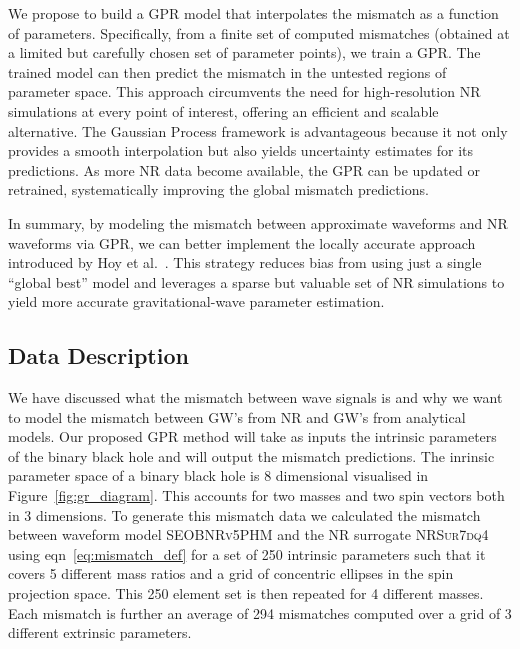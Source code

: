 \documentclass[12pt]{article}
\begin{document}
We propose to build a GPR model that interpolates the mismatch as a function of parameters. Specifically, from a finite set of computed mismatches (obtained at a limited but carefully chosen set of parameter points), we train a GPR. The trained model can then predict the mismatch in the untested regions of parameter space. This approach circumvents the need for high-resolution NR simulations at every point of interest,
offering an efficient and scalable alternative. The Gaussian Process framework is advantageous because it not only provides a smooth interpolation but also yields uncertainty estimates for its predictions.
 As more NR data become available, the GPR can be updated or retrained, systematically improving the global mismatch predictions.

 In summary, by modeling the mismatch between approximate waveforms and NR waveforms via GPR, we can better implement the locally accurate approach introduced by Hoy et al.~\cite{Ogpaper}. This strategy reduces bias from using just a single “global best” model and leverages a sparse but valuable set of NR simulations to yield more accurate gravitational-wave parameter estimation.

\subsection{Data Description}
We have discussed what the mismatch between wave signals is and why we want to model the mismatch between GW's from NR and GW's from analytical models.
Our proposed GPR method will take as inputs the intrinsic parameters of the binary black hole and will output the mismatch predictions.
The inrinsic parameter space of a binary black hole is 8 dimensional visualised in Figure~\ref{fig:gr_diagram}. This accounts for two masses and two spin vectors both in 3 dimensions. 
To generate this mismatch data we calculated the mismatch between waveform model \textsc{SEOBNRv5PHM} and the NR surrogate \textsc{NRSur7dq4} using eqn~\eqref{eq:mismatch_def} for a set of 250 intrinsic parameters 
such that it covers 5 different mass ratios and a grid of concentric ellipses in the spin projection space.
This 250 element set is then repeated for 4 different masses.
Each mismatch is further an average of 294 mismatches computed over a grid of 3 different extrinsic parameters.
%
\end{document}
